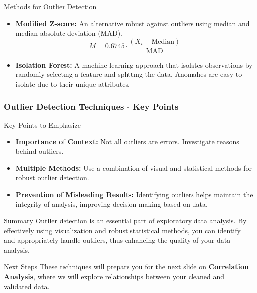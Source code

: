 \documentclass[aspectratio=169]{beamer}
\begin{document}
\begin{frame}[fragile]
\begin{block}{Methods for Outlier Detection}
\begin{enumerate}
\begin{itemize}
                \item \textbf{Modified Z-score:} An alternative robust against outliers using median and median absolute deviation (MAD).
                \begin{equation}
                    M = 0.6745 \cdot \frac{(X_i - \text{Median})}{\text{MAD}}
                \end{equation}

                \item \textbf{Isolation Forest:} A machine learning approach that isolates observations by randomly selecting a feature and splitting the data. Anomalies are easy to isolate due to their unique attributes.
            \end{itemize}
        \end{enumerate}
    \end{block}
\end{frame}

\begin{frame}[fragile]
    \frametitle{Outlier Detection Techniques - Key Points}
    \begin{block}{Key Points to Emphasize}
        \begin{itemize}
            \item \textbf{Importance of Context:} Not all outliers are errors. Investigate reasons behind outliers.
            \item \textbf{Multiple Methods:} Use a combination of visual and statistical methods for robust outlier detection.
            \item \textbf{Prevention of Misleading Results:} Identifying outliers helps maintain the integrity of analysis, improving decision-making based on data.
        \end{itemize}
    \end{block}
    
    \begin{block}{Summary}
        Outlier detection is an essential part of exploratory data analysis. By effectively using visualization and robust statistical methods, you can identify and appropriately handle outliers, thus enhancing the quality of your data analysis.
    \end{block}
    
    \begin{block}{Next Steps}
        These techniques will prepare you for the next slide on \textbf{Correlation Analysis}, where we will explore relationships between your cleaned and validated data.
    \end{block}
\end{frame}
\end{document}
